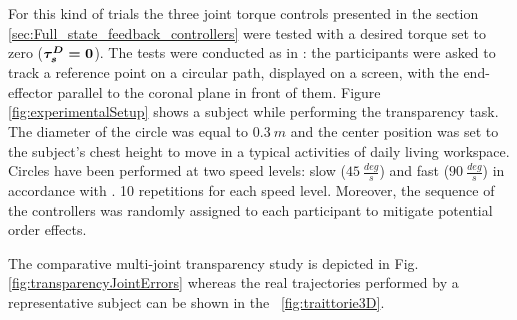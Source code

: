 For this kind of trials the three joint torque controls presented in the section \ref{sec:Full_state_feedback_controllers} were tested with a desired torque set to zero (${ \boldsymbol {\tau_s^D=0}}$).%
The tests were conducted as in \cite{just2018exoskeleton}: the participants were asked to track a reference point on a circular path, displayed on a screen, with the end-effector parallel to the coronal plane in front of them. Figure \ref{fig:experimentalSetup} shows a subject while performing the transparency task.
The diameter of the circle was equal to $0.3 ~ m$ and the center position was set to the subject's chest height to move in a typical activities of daily living workspace. Circles have been performed at two speed levels: slow ($45 ~ \frac{deg}{s}$) and fast ($90 ~ \frac{deg}{s}$) in accordance with \cite{just2018exoskeleton}. 10 repetitions for each speed level. 
Moreover, the sequence of the controllers was randomly assigned to each participant to mitigate potential order effects.



%
%
The comparative multi-joint transparency study is depicted in Fig. \ref{fig:transparencyJointErrors} whereas the real trajectories performed by a representative subject can be shown in the \figurename \ \ref{fig:traittorie3D}. 

